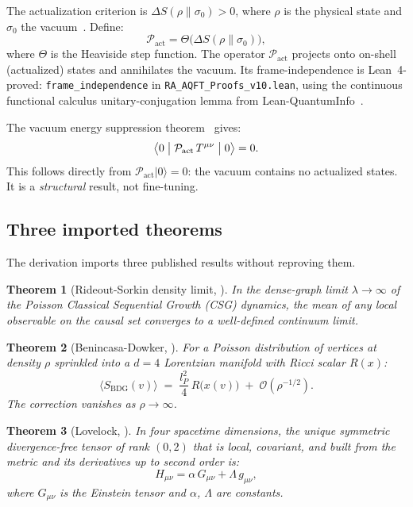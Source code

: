 \documentclass[11pt,a4paper]{article}
\newtheorem{theorem}{Theorem}[section]
\newcommand{\Pact}{\mathcal{P}_{\mathrm{act}}}
\newcommand{\SBDG}{S_{\mathrm{BDG}}}
\newcommand{\dS}{\Delta S}
\begin{document}
The actualization criterion is $\dS(\rho\|\sigma_0) > 0$, where
$\rho$ is the physical state and $\sigma_0$ the vacuum~\citep{Sandeman2026RAQM}.
Define:
\begin{equation}
  \Pact = \Theta\!\bigl(\dS(\rho\|\sigma_0)\bigr),
\end{equation}
where $\Theta$ is the Heaviside step function. The operator $\Pact$
projects onto on-shell (actualized) states and annihilates the vacuum.
Its frame-independence is Lean~4-proved:
\texttt{frame\_independence} in \texttt{RA\_AQFT\_Proofs\_v10.lean},
using the continuous functional calculus unitary-conjugation lemma
from Lean-QuantumInfo~\citep{Meiburg2025LQI}.

The vacuum energy suppression theorem~\citep{Sandeman2026RAGC} gives:
\begin{equation}
  \bigl\langle 0 \bigm| \Pact\, T^{\mu\nu} \bigm| 0 \bigr\rangle = 0.
  \label{eq:vacuum_suppression}
\end{equation}
This follows directly from $\Pact|0\rangle = 0$: the vacuum contains
no actualized states. It is a \emph{structural} result, not
fine-tuning.

\subsection{Three imported theorems}

The derivation imports three published results without reproving them.

\begin{theorem}[Rideout-Sorkin density limit, \citep{RideoutSorkin2000}]
\label{thm:rs}
In the dense-graph limit $\lambda \to \infty$ of the Poisson
Classical Sequential Growth (CSG) dynamics, the mean of any local
observable on the causal set converges to a well-defined continuum
limit.
\end{theorem}

\begin{theorem}[Benincasa-Dowker, \citep{Benincasa2010}]
\label{thm:bd}
For a Poisson distribution of vertices at density $\rho$ sprinkled
into a $d{=}4$ Lorentzian manifold with Ricci scalar $R(x)$:
\begin{equation}
  \bigl\langle \SBDG(v) \bigr\rangle
  \;=\; \frac{l_P^2}{4}\,R\bigl(x(v)\bigr)
        \;+\; \mathcal{O}(\rho^{-1/2}).
\end{equation}
The correction vanishes as $\rho \to \infty$.
\end{theorem}

\begin{theorem}[Lovelock, \citep{Lovelock1971}]
\label{thm:lovelock}
In four spacetime dimensions, the unique symmetric
divergence-free tensor of rank $(0,2)$ that is local, covariant,
and built from the metric and its derivatives up to second order is:
\begin{equation}
  H_{\mu\nu} = \alpha\, G_{\mu\nu} + \Lambda\, g_{\mu\nu},
\end{equation}
where $G_{\mu\nu}$ is the Einstein tensor and $\alpha$, $\Lambda$
are constants.
\end{theorem}
\end{document}

